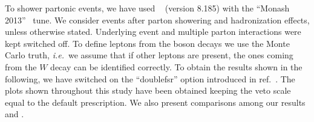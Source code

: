 To shower partonic events, we have used
~\cite{Sjostrand:2007gs} (version 8.185) with the ``Monash
2013''~\cite{Skands:2014pea} tune. We consider events after parton
showering and hadronization effects, unless otherwise
stated. Underlying event and multiple parton interactions were kept
switched off. To define leptons from the boson decays we use the Monte
Carlo truth, \emph{i.e.}~we assume that if other leptons are present,
the ones coming from the $W$ decay can be identified correctly.  To
obtain the results shown in the following, we have switched on the
``doublefsr'' option introduced in ref.~\cite{Nason:2013uba}.
%
The plots shown throughout this study have been obtained keeping the
veto scale equal to the default \POWHEG{} prescription.
%
We also present comparisons among our results and \HVNNLO{}.


